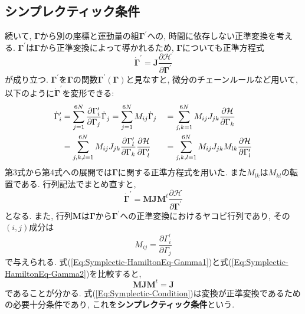 \subsection{シンプレクティック条件}
続いて, $\bm{\Gamma}$から別の座標と運動量の組$\bm{\Gamma}^{\prime}$への, 時間に依存しない正準変換を考える. 
$\bm{\Gamma}^{\prime}$は$\bm{\Gamma}$から正準変換によって導かれるため, $\bm{\Gamma}$についても正準方程式
\begin{equation}
  \dot{\bm{\Gamma}}^{\prime}
  =
  \bm{J}\frac{\partial \mathcal{H}}{\partial \bm{\Gamma}^{\prime}}
  \label{Eq:Symplectic-HamiltonEq-Gamma1}
\end{equation}
が成り立つ. 
$\bm{\Gamma}^{\prime}$を$\bm{\Gamma}$の関数$\bm{\Gamma}^{\prime}(\bm{\Gamma})$と見なすと, 微分のチェーンルールなど用いて, 以下のように$\dot{\bm{\Gamma}}^{\prime}$を変形できる:
\begin{alignat}{2}
  \dot{\Gamma}_{i}^{\prime}
  &=
  \sum_{j=1}^{6N}
  \frac{\partial \Gamma_{i}^{\prime}}{\partial \Gamma_{j}} \dot{\Gamma}_{j}
  =
  \sum_{j=1}^{6N} M_{ij} \dot{\Gamma}_{j}
  &&=
  \sum_{j,k=1}^{6N}
  M_{ij} J_{jk} \frac{\partial \mathcal{H}}{\partial \Gamma_{k}}
  \notag
  \\
  &=
  \sum_{j,k,l=1}^{6N}
  M_{ij} J_{jk}
  \frac{\partial \Gamma_{l}^{\prime}}{\partial \Gamma_{k}}
  \frac{\partial \mathcal{H}}{\partial \Gamma_{l}^{\prime}}
  &&=
  \sum_{j,k,l=1}^{6N}
  M_{ij} J_{jk} M_{lk}
  \frac{\partial \mathcal{H}}{\partial \Gamma_{l}^{\prime}}
  \notag
\end{alignat}
第3式から第4式への展開では$\bm{\Gamma}$に関する正準方程式を用いた. 
また$M_{lk}$は$M_{kl}$の転置である. 
行列記法でまとめ直すと, 
\begin{equation}
  \dot{\bm{\Gamma}}^{\prime}
  =
  \bm{M} \bm{J} \bm{M}^{t}
  \frac{\partial \mathcal{H}}{\partial \bm{\Gamma}^{\prime}}
  \label{Eq:Symplectic-HamiltonEq-Gamma2}
\end{equation}
となる. また, 行列$\bm{M}$は$\bm{\Gamma}$から$\bm{\Gamma}^{\prime}$への正準変換におけるヤコビ行列であり, その$(i,j)$成分は
\begin{equation}
  M_{ij} = \frac{\partial \Gamma_{i}^{\prime}}{\partial \Gamma_{j}}
  \label{Eq:Jacobi-Matrix}
\end{equation}
で与えられる. 
式(\ref{Eq:Symplectic-HamiltonEq-Gamma1})と式(\ref{Eq:Symplectic-HamiltonEq-Gamma2})を比較すると, 
\begin{equation}
  \bm{M} \bm{J} \bm{M}^{t} = \bm{J}
  \label{Eq:Symplectic-Condition}
\end{equation}
であることが分かる. 
式(\ref{Eq:Symplectic-Condition})は変換が正準変換であるための必要十分条件であり, これを\textbf{シンプレクティック条件}という. 

